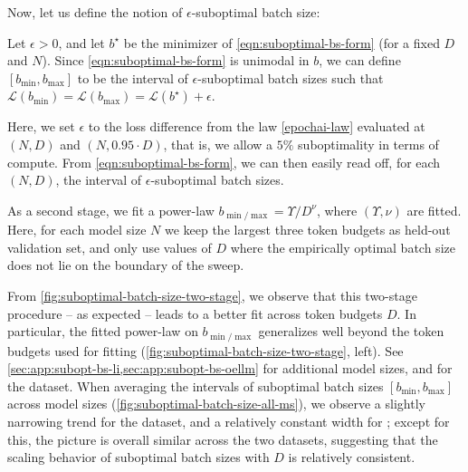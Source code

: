 \documentclass[12pt,a4paper,twoside]{article}
\begin{document}
Now, let us define the notion of $\epsilon$-suboptimal batch size:
\begin{definition}
    Let $\epsilon > 0$, and let $b^\star$ be the minimizer of \eqref{eqn:suboptimal-bs-form} (for a fixed $D$ and $N$). Since \eqref{eqn:suboptimal-bs-form} is unimodal in $b$, we can define $[b_{\min}, b_{\max}]$ to be the interval of $\epsilon$-suboptimal batch sizes such that $\mathcal{L}(b_{\min}) = \mathcal{L}(b_{\max}) = \mathcal{L}(b^\star) + \epsilon$.
\end{definition}
Here, we set $\epsilon$ to the loss difference from the law \eqref{epochai-law} evaluated at $(N,D)$ and $(N, 0.95\cdot D)$, that is, we allow a $5\%$ suboptimality in terms of compute.
From \eqref{eqn:suboptimal-bs-form}, we can then easily read off, for each $(N,D)$, the interval of $\epsilon$-suboptimal batch sizes.

As a second stage, we fit a power-law $b_{\min/\max} = \Upsilon /  D^{\nu}$, where $(\Upsilon, \nu)$ are fitted. Here, for each model size $N$ we keep the largest three token budgets as held-out validation set, and only use values of $D$ where the empirically optimal batch size does not lie on the boundary of the sweep.

From \cref{fig:suboptimal-batch-size-two-stage}, we observe that this two-stage procedure -- as expected -- leads to a better fit across token budgets $D$. In particular, the fitted power-law on $b_{\min/\max}$ generalizes well beyond the token budgets used for fitting (\cref{fig:suboptimal-batch-size-two-stage}, left). See \cref{sec:app:subopt-bs-li,sec:app:subopt-bs-oellm} for additional model sizes, and for the \oellm{} dataset. When averaging the intervals of suboptimal batch sizes $[b_{\min}, b_{\max}]$ across model sizes (\cref{fig:suboptimal-batch-size-all-ms}), we observe a slightly narrowing trend for the \li{} dataset, and a relatively constant width for \oellm{}; except for this, the picture is overall similar across the two datasets, suggesting that the scaling behavior of suboptimal batch sizes with $D$ is relatively consistent.


\end{document}
